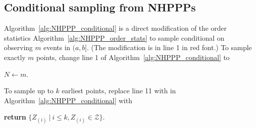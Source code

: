 \documentclass[article]{jss}\usepackage[]{graphicx}\usepackage[]{xcolor}
\begin{document}
\begin{appendix}


\newpage
\section{Conditional sampling from NHPPPs} \label{app:conditional_sampling}
Algorithm~\ref{alg:NHPPP_conditional} is a direct modification of the order statistics Algorithm~\ref{alg:NHPPP_order_stats} to sample conditional on observing $m$ events in $(a,b]$. (The modification is in line 1 in red font.)
To sample exactly $m$ points, change line 1 of Algorithm~\ref{alg:NHPPP_conditional} to
\begin{center}
$N \gets m$.
\end{center}
To sample up to $k$ earliest points, replace line 11 with in Algorithm~\ref{alg:NHPPP_conditional} with
\begin{center}
\textbf{return} {$\{Z_{(i)} \ | \ i \le k, Z_{(i)} \in \mathcal{Z}\}$}.
\end{center}









\end{appendix}
\newpage
\end{document}
